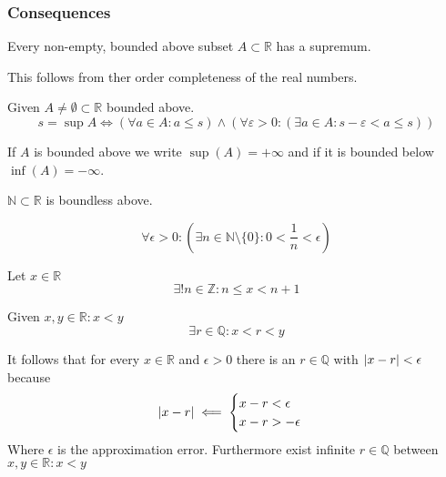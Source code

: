 \subsubsection{Consequences}
\begin{proposition}\label{pro:supremum}
   Every non-empty, bounded above subset \(A \subset \mathbb{R}\) has a supremum.
\end{proposition}
\begin{remark}
   This follows from ther order completeness of the real numbers.
\end{remark}

\begin{proposition}\label{pro:supremum_epsilon}
   Given \(A \neq \emptyset \subset \mathbb{R}\) bounded above.
   \[s = \sup A \iff (\forall a \in A: a \leq s) \land (\forall \varepsilon > 0: (\exists a \in A: s - \varepsilon < a \leq s))\]
\end{proposition}
\begin{remark}
   If \(A\) is bounded above we write \(\sup(A) = +\infty\) and if it is bounded below \(\inf(A) = -\infty\).
\end{remark}

\begin{theorem}\label{thm:archimedes}
   \(\mathbb{N} \subset \mathbb{R}\) is boundless above.
\end{theorem}

\begin{corollary}\label{cor:arch}
   \[\forall \epsilon > 0: \left(\exists n \in \mathbb{N} \setminus \{0\}: 0 < \frac{1}{n} < \epsilon \right)\]
\end{corollary}

\begin{proposition}\label{pro:surrounding_n}
   Let \(x \in \mathbb{R}\)
   \[\exists! n \in \mathbb{Z}: n \leq x < n + 1\]
\end{proposition}

\begin{proposition}\label{pro:Q_density}
   Given \(x, y \in \mathbb{R}: x < y\)
   \[\exists r \in \mathbb{Q}: x < r < y\]
\end{proposition}
\begin{remark}
   It follows that for every \(x \in \mathbb{R}\) and \(\epsilon > 0\) there is an \(r \in \mathbb{Q}\) with \(\left\lvert x - r\right\rvert < \epsilon\) because
   \[\left\lvert x - r\right\rvert \impliedby \begin{cases} x - r < \epsilon\\ x - r > - \epsilon \end{cases}\]
   Where \(\epsilon\) is the approximation error.
   Furthermore exist infinite \(r \in \mathbb{Q}\) between \(x, y \in \mathbb{R}: x < y\)
\end{remark}

